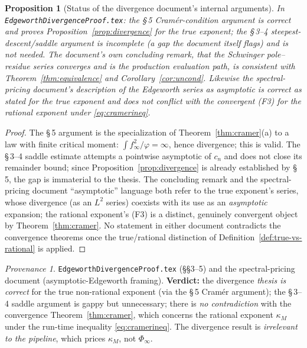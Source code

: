 \documentclass[11pt]{article}
\theoremstyle{plain}
\newtheorem{proposition}[theorem]{Proposition}
\theoremstyle{definition}
\theoremstyle{remark}
\newtheorem*{provenance}{Provenance}
\begin{document}
\begin{proposition}[Status of the divergence document's internal arguments]
\label{prop:divdoc-status}
In \texttt{EdgeworthDivergenceProof.tex}: the \S\,5 Cramér-condition argument is
\emph{correct} and proves Proposition~\ref{prop:divergence} for the true exponent;
the \S\,3--4 steepest-descent/saddle argument is \emph{incomplete} (a gap the
document itself flags) and is not needed. The document's own concluding remark, that
the Schwinger pole--residue series converges and is the production evaluation path,
is \emph{consistent} with Theorem~\ref{thm:equivalence} and
Corollary~\ref{cor:uncond}. Likewise the spectral-pricing document's description of the
Edgeworth series as \emph{asymptotic} is \emph{correct as stated for the true
exponent} and does not conflict with the convergent \textup{(F3)} for the rational
exponent under \eqref{eq:cramerineq}.
\end{proposition}
\begin{proof}
The \S\,5 argument is the specialization of Theorem~\ref{thm:cramer}(a) to a law with
finite critical moment: $\int f_\infty^2/\varphi=\infty$, hence divergence; this is
valid. The \S\,3--4 saddle estimate attempts a pointwise asymptotic of $c_n$ and does
not close its remainder bound; since Proposition~\ref{prop:divergence} is already
established by \S\,5, the gap is immaterial to the thesis. The concluding remark and
the spectral-pricing document ``asymptotic'' language both refer to the true
exponent's series, whose divergence (as an $L^2$ series) coexists with its use as an
\emph{asymptotic} expansion; the rational exponent's \textup{(F3)} is a distinct,
genuinely convergent object by Theorem~\ref{thm:cramer}. No statement in either
document contradicts the convergence theorems once the true/rational distinction of
Definition~\ref{def:true-vs-rational} is applied.
\end{proof}

\begin{provenance}
\texttt{EdgeworthDivergenceProof.tex} (\S\S3--5) and the spectral-pricing document
(asymptotic-Edgeworth framing). \textbf{Verdict:} the divergence \emph{thesis is
correct} for the true non-rational exponent (via the \S\,5 Cramér argument); the
\S\,3--4 saddle argument is gappy but unnecessary; there is \emph{no contradiction}
with the convergence Theorem~\ref{thm:cramer}, which concerns the rational exponent
$\kappa_M$ under the run-time inequality \eqref{eq:cramerineq}. The divergence result
is \emph{irrelevant to the pipeline}, which prices $\kappa_M$, not $\Phi_\infty$.
\end{provenance}
\end{document}
